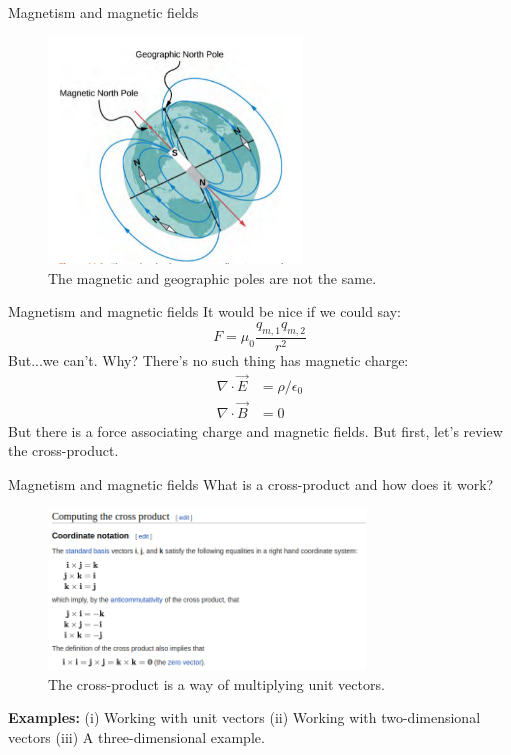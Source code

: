 \documentclass{beamer}
\begin{document}
\begin{frame}{Magnetism and magnetic fields}
\begin{figure}
\centering
\includegraphics[width=0.6\textwidth,trim=0cm 0.1cm 0cm 0cm,clip=true]{figures/fields2.png}
\caption{\label{fields2} The magnetic and geographic poles are not the same.}
\end{figure}
\end{frame}

\begin{frame}{Magnetism and magnetic fields}
It would be nice if we could say:
\begin{equation}
F = \mu_0 \frac{q_{m,1} q_{m,2}}{r^2}
\end{equation}
But...we can't.  Why?  There's no such thing has magnetic charge:
\begin{align}
\nabla \cdot \vec{E} &= \rho/\epsilon_0 \\ 
\nabla \cdot \vec{B} &= 0
\end{align}
But there is a force associating charge and magnetic fields.  But first, let's review the cross-product.
\end{frame}

\begin{frame}{Magnetism and magnetic fields}
What is a cross-product and how does it work? \\ \vspace{0.25cm}
\begin{figure}
\centering
\includegraphics[width=0.75\textwidth]{figures/crossP.png}
\caption{\label{fig:crossP} The cross-product is a way of multiplying unit vectors.}
\end{figure}
\textbf{Examples:} (i) Working with unit vectors (ii) Working with two-dimensional vectors (iii) A three-dimensional example.
\end{frame}
\end{document}
